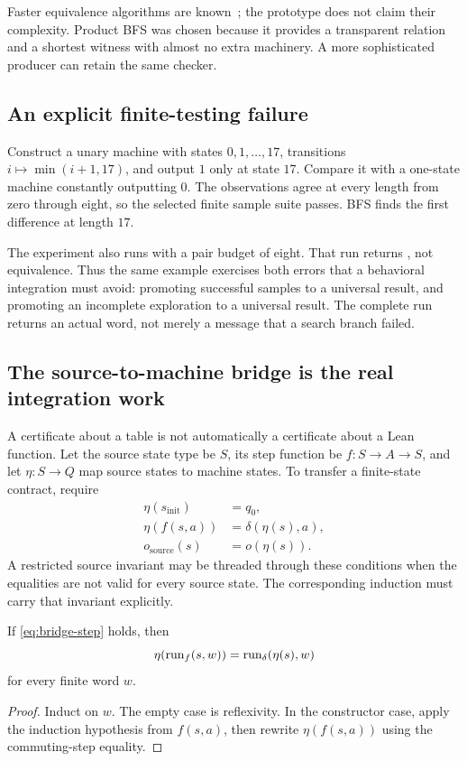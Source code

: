 Faster equivalence algorithms are known~\cite{automata-equivalence}; the prototype does not claim their complexity. Product BFS was chosen because it provides a transparent relation and a shortest witness with almost no extra machinery. A more sophisticated producer can retain the same checker.

\subsection{An explicit finite-testing failure}

Construct a unary machine with states $0,1,\ldots,17$, transitions $i\mapsto\min(i+1,17)$, and output $1$ only at state $17$. Compare it with a one-state machine constantly outputting $0$. The observations agree at every length from zero through eight, so the selected finite sample suite passes. BFS finds the first difference at length $17$.

The experiment also runs with a pair budget of eight. That run returns \unknown{}, not equivalence. Thus the same example exercises both errors that a behavioral integration must avoid: promoting successful samples to a universal result, and promoting an incomplete exploration to a universal result. The complete run returns an actual word, not merely a message that a search branch failed.

\subsection{The source-to-machine bridge is the real integration work}

A certificate about a table is not automatically a certificate about a Lean function. Let the source state type be $S$, its step function be $f:S\to A\to S$, and let $\eta:S\to Q$ map source states to machine states. To transfer a finite-state contract, require
\begin{align}
 \eta(s_{\mathrm{init}})&=q_0,\label{eq:bridge-init}\\
 \eta(f(s,a))&=\delta(\eta(s),a),\label{eq:bridge-step}\\
 o_{\mathrm{source}}(s)&=o(\eta(s)).\label{eq:bridge-out}
\end{align}
A restricted source invariant may be threaded through these conditions when the equalities are not valid for every source state. The corresponding induction must carry that invariant explicitly.

\begin{theorem}
If \eqref{eq:bridge-step} holds, then
\[
 \eta(\operatorname{run}_f(s,w))=\operatorname{run}_\delta(\eta(s),w)
\]
for every finite word $w$.
\end{theorem}
\begin{proof}
Induct on $w$. The empty case is reflexivity. In the constructor case, apply the induction hypothesis from $f(s,a)$, then rewrite $\eta(f(s,a))$ using the commuting-step equality.
\end{proof}

